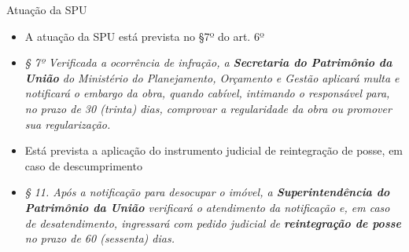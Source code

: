 \documentclass[9pt,ignorenonframetext,]{beamer}
\providecommand{\tightlist}{%
  \setlength{\itemsep}{0pt}\setlength{\parskip}{0pt}}
\begin{document}
\begin{frame}{Atuação da SPU}

\begin{itemize}[<+->]
\tightlist
\item
  \alert<1>{A atuação da SPU está prevista no §7º do art. 6º}
\end{itemize}

\begin{itemize}[<+->]
\tightlist
\item
  \alert<2>{\emph{§ 7º Verificada a ocorrência de infração, a
  \textbf{Secretaria do Patrimônio da União} do Ministério do Planejamento,
  Orçamento e Gestão aplicará multa e notificará o embargo da obra, quando
  cabível, intimando o responsável para, no prazo de 30 (trinta) dias, comprovar a
  regularidade da obra ou promover sua regularização.}}
\end{itemize}

\begin{itemize}[<+->]
\tightlist
\item
  \alert<3>{Está prevista a aplicação do instrumento judicial de reintegração 
  de posse, em caso de descumprimento}
\end{itemize}

\begin{itemize}[<+->]
\tightlist
\item
  \alert<4>{\emph{§ 11.  Após a notificação para desocupar o imóvel, a
  \textbf{Superintendência do Patrimônio da União} verificará o atendimento da
  notificação e, em caso de desatendimento, ingressará com pedido judicial de
  \textbf{reintegração de posse} no prazo de 60 (sessenta) dias.}}
\end{itemize}

\end{frame}
\end{document}
